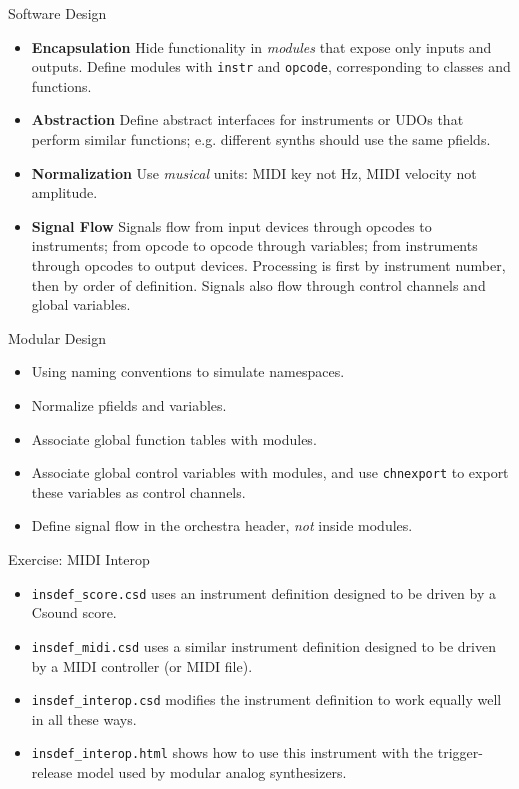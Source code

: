 \documentclass{beamer}
\begin{document}
    \begin{frame}{Software Design}
        \begin{itemize}
            \item \textbf{Encapsulation} Hide functionality in \textit{modules} that
            expose only inputs and outputs. Define modules with \texttt{instr} and
            \texttt{opcode}, corresponding to classes and functions.
            \item \textbf{Abstraction} Define abstract interfaces for instruments or
            UDOs that perform similar functions; e.g. different synths should use the same
            pfields.
            \item \textbf{Normalization} Use \textit{musical} units: MIDI key not
            Hz, MIDI velocity not amplitude.
            \item \textbf{Signal Flow} Signals flow from input devices through
            opcodes to instruments; from opcode to opcode through variables; from
            instruments through opcodes to output devices. Processing is first by
            instrument number, then by order of definition. Signals also flow through
            control channels and global variables.
        \end{itemize}
    \end{frame}
    
    \begin{frame}{Modular Design}
        \begin{itemize}
            \item Using naming conventions to simulate namespaces.
            \item Normalize pfields and variables.
            \item Associate global function tables with modules.
            \item Associate global control variables with modules, and use
            \texttt{chnexport} to  export these variables as control channels.
            \item Define signal flow in the orchestra header, \textit{not} inside modules.
        \end{itemize}
    \end{frame}
    
    \begin{frame}{Exercise: MIDI Interop}
    	\begin{itemize}
		\item \texttt{insdef\_score.csd} uses an instrument definition designed to be driven by a Csound score.
		\item \texttt{insdef\_midi.csd}  uses a similar instrument definition designed to be driven by a MIDI controller (or MIDI file).
		\item \texttt{insdef\_interop.csd}  modifies the instrument definition to work equally well in all these ways.
		\item \texttt{insdef\_interop.html} shows how to use this instrument with the trigger-release model used by modular analog synthesizers.
	\end{itemize}
    \end{frame}
    
\end{document}
